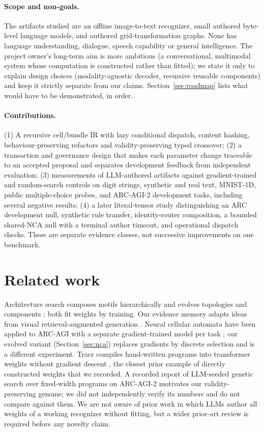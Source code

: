 \documentclass[11pt]{article}
\begin{document}
\paragraph{Scope and non-goals.}
The artifacts studied are an offline image-to-text recognizer, small authored byte-level
language models, and authored grid-transformation graphs. None has language understanding,
dialogue, speech capability or general intelligence. The project owner's long-term aim is more
ambitious (a conversational, multimodal system whose computation is constructed rather than
fitted); we state it only to explain design choices (modality-agnostic decoder, recursive
reusable components) and keep it strictly separate from our claims. Section~\ref{sec:roadmap}
lists what would have to be demonstrated, in order.

\paragraph{Contributions.}
(1) A recursive cell/bundle IR with lazy conditional dispatch, content hashing,
behaviour-preserving refactors and validity-preserving typed crossover; (2) a transaction and
governance design that makes each parameter change traceable to an accepted proposal and
separates development feedback from independent evaluation; (3) measurements of
LLM-authored artifacts against gradient-trained and random-search controls on digit strings,
synthetic and real text, MNIST-1D, public multiple-choice probes, and ARC-AGI-2 development
tasks, including several negative results; (4) a later literal-tensor study distinguishing an
ARC development null, synthetic rule transfer, identity-router composition, a bounded shared-NCA
null with a terminal author timeout, and operational dispatch checks. These are separate evidence classes, not successive improvements on one benchmark.

\section{Related work}
Architecture search composes motifs hierarchically \cite{liu2018hierarchical} and evolves
topologies and components \cite{miikkulainen2017evolving}; both fit weights by training.
Our evidence memory adapts ideas from visual retrieval-augmented generation
\cite{yu2024visrag,sun2025visrag2,wang2026vimrag}. Neural cellular automata have been applied
to ARC-AGI with a separate gradient-trained model per task \cite{xu2025nca}; our evolved
variant (Section~\ref{sec:nca}) replaces gradients by discrete selection and is a different
experiment. Tracr compiles hand-written programs into transformer weights without gradient
descent \cite{tracr}, the closest prior example of directly constructed weights that we
recorded. A recorded report of LLM-seeded genetic search over fixed-width programs on ARC-AGI-2
\cite{gensearch} motivates our validity-preserving genome; we did not independently
verify its numbers and do not compare against them. We are not aware of prior work in which
LLMs author all weights of a working recognizer without fitting, but a wider prior-art review is
required before any novelty claim.
\end{document}
